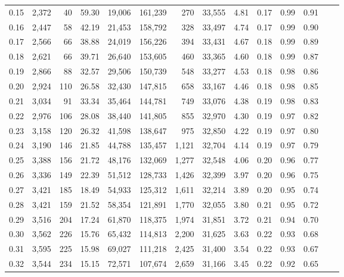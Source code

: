 \begin{tabular}{rrrrrrrrrrrrrr}
0.15 &  2,372 &   40 &   59.30 &   19,006 &  161,239 &     270 &  33,555 &  4.81 &  0.17 &  0.99 &      0.91 \\
0.16 &  2,447 &   58 &   42.19 &   21,453 &  158,792 &     328 &  33,497 &  4.74 &  0.17 &  0.99 &      0.90 \\
0.17 &  2,566 &   66 &   38.88 &   24,019 &  156,226 &     394 &  33,431 &  4.67 &  0.18 &  0.99 &      0.89 \\
0.18 &  2,621 &   66 &   39.71 &   26,640 &  153,605 &     460 &  33,365 &  4.60 &  0.18 &  0.99 &      0.87 \\
0.19 &  2,866 &   88 &   32.57 &   29,506 &  150,739 &     548 &  33,277 &  4.53 &  0.18 &  0.98 &      0.86 \\
0.20 &  2,924 &  110 &   26.58 &   32,430 &  147,815 &     658 &  33,167 &  4.46 &  0.18 &  0.98 &      0.85 \\
0.21 &  3,034 &   91 &   33.34 &   35,464 &  144,781 &     749 &  33,076 &  4.38 &  0.19 &  0.98 &      0.83 \\
0.22 &  2,976 &  106 &   28.08 &   38,440 &  141,805 &     855 &  32,970 &  4.30 &  0.19 &  0.97 &      0.82 \\
0.23 &  3,158 &  120 &   26.32 &   41,598 &  138,647 &     975 &  32,850 &  4.22 &  0.19 &  0.97 &      0.80 \\
0.24 &  3,190 &  146 &   21.85 &   44,788 &  135,457 &   1,121 &  32,704 &  4.14 &  0.19 &  0.97 &      0.79 \\
0.25 &  3,388 &  156 &   21.72 &   48,176 &  132,069 &   1,277 &  32,548 &  4.06 &  0.20 &  0.96 &      0.77 \\
0.26 &  3,336 &  149 &   22.39 &   51,512 &  128,733 &   1,426 &  32,399 &  3.97 &  0.20 &  0.96 &      0.75 \\
0.27 &  3,421 &  185 &   18.49 &   54,933 &  125,312 &   1,611 &  32,214 &  3.89 &  0.20 &  0.95 &      0.74 \\
0.28 &  3,421 &  159 &   21.52 &   58,354 &  121,891 &   1,770 &  32,055 &  3.80 &  0.21 &  0.95 &      0.72 \\
0.29 &  3,516 &  204 &   17.24 &   61,870 &  118,375 &   1,974 &  31,851 &  3.72 &  0.21 &  0.94 &      0.70 \\
0.30 &  3,562 &  226 &   15.76 &   65,432 &  114,813 &   2,200 &  31,625 &  3.63 &  0.22 &  0.93 &      0.68 \\
0.31 &  3,595 &  225 &   15.98 &   69,027 &  111,218 &   2,425 &  31,400 &  3.54 &  0.22 &  0.93 &      0.67 \\
0.32 &  3,544 &  234 &   15.15 &   72,571 &  107,674 &   2,659 &  31,166 &  3.45 &  0.22 &  0.92 &      0.65 \\

\end{tabular}

